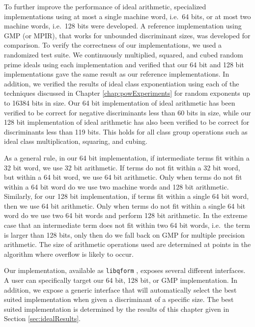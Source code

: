 \documentclass{ucalgthes1}
\theoremstyle{definition}
\begin{document}
To further improve the performance of ideal arithmetic, specialized implementations using at most a single machine word, i.e.\ 64 bits, or at most two machine words, i.e.\ 128 bits were developed.  A reference implementation using GMP (or MPIR), that works for unbounded discriminant sizes, was developed for comparison.  To verify the correctness of our implementations, we used a randomized test suite.  We continuously multiplied, squared, and cubed random prime ideals using each implementation and verified that our 64 bit and 128 bit implementations gave the same result as our reference implementations.  In addition, we verified the results of ideal class exponentiation using each of the techniques discussed in Chapter \ref{chap:powExperiments} for random exponents up to 16384 bits in size.  Our 64 bit implementation of ideal arithmetic has been verified to be correct for negative discriminants less than 60 bits in size, while our 128 bit implementation of ideal arithmetic has also been verified to be correct for discriminants less than 119 bits.  This holds for all class group operations such as ideal class multiplication, squaring, and cubing.  

As a general rule, in our 64 bit implementation, if intermediate terms fit within a 32 bit word, we use 32 bit arithmetic.  If terms do not fit within a 32 bit word, but within a 64 bit word, we use 64 bit arithmetic.  Only when terms do not fit within a 64 bit word do we use two machine words and 128 bit arithmetic.  Similarly, for our 128 bit implementation, if terms fit within a single 64 bit word, then we use 64 bit arithmetic.  Only when terms do not fit within a single 64 bit word do we use two 64 bit words and perform 128 bit arithmetic.  In the extreme case that an intermediate term does not fit within two 64 bit words, i.e.\ the term is larger than 128 bits, only then do we fall back on GMP for multiple precision arithmetic.  The size of arithmetic operations used are determined at points in the algorithm where overflow is likely to occur.

Our implementation, available as \texttt{libqform} \cite{libqform}, exposes several different interfaces.  A user can specifically target our 64 bit, 128 bit, or GMP implementation.  In addition, we expose a generic interface that will automatically select the best suited implementation when given a discriminant of a specific size.  The best suited implementation is determined by the results of this chapter given in Section \ref{sec:idealResults}.
\end{document}
